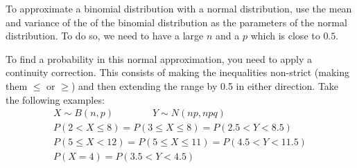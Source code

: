 \documentclass[../main.tex]{subfile}
\begin{document}

\vspace{-3ex}

To approximate a binomial distribution with a normal distribution, use the mean and variance of the of the binomial distribution as the parameters of the normal distribution. To do so, we need to have a large $n$ and a $p$ which is close to $0.5$.

To find a probability in this normal approximation, you need to apply a continuity correction. This consists of making the inequalities non-strict (making them $\le$ or $\ge$) and then extending the range by 0.5 in either direction. Take the following examples:
\begin{gather*}
	X \sim B(n, p)\hspace{4em}Y \sim N(np, npq)\\[2ex]
	P(2 < X \le 8) = P(3 \le X \le 8) = P(2.5 < Y < 8.5)\\[2ex]
	P(5 \le X < 12) = P(5 \le X \le 11) = P(4.5 < Y < 11.5)\\[2ex]
	P(X = 4) = P(3.5 < Y < 4.5)
\end{gather*}
\end{document}
